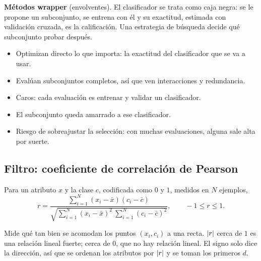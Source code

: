 \documentclass[11pt,letterpaper]{article}
\begin{document}
\textbf{Métodos wrapper} (envolventes). El clasificador se trata como
caja negra: se le propone un subconjunto, se entrena con él y su
exactitud, estimada con validación cruzada, es la calificación. Una
estrategia de búsqueda decide qué subconjunto probar después.

\begin{itemize}[itemsep=0.2em]
    \item[$+$] Optimizan directo lo que importa: la exactitud del
          clasificador que se va a usar.
    \item[$+$] Evalúan subconjuntos completos, así que ven
          interacciones y redundancia.
    \item[$-$] Caros: cada evaluación es entrenar y validar un
          clasificador.
    \item[$-$] El subconjunto queda amarrado a ese clasificador.
    \item[$-$] Riesgo de sobreajustar la selección: con muchas
          evaluaciones, alguna sale alta por suerte.
\end{itemize}


\subsection*{Filtro: coeficiente de correlación de Pearson}

\begin{definicion}
    Para un atributo $x$ y la clase $c$, codificada como $0$ y $1$,
    medidos en $N$ ejemplos,
    \[
        r = \frac{\sum_{i=1}^{N} (x_i - \bar{x})(c_i - \bar{c})}
                 {\sqrt{\sum_{i=1}^{N} (x_i - \bar{x})^2
                        \ \sum_{i=1}^{N} (c_i - \bar{c})^2}} ,
        \qquad -1 \le r \le 1 .
    \]
\end{definicion}

Mide qué tan bien se acomodan los puntos $(x_i, c_i)$ a una recta.
$\left\lvert r \right\rvert$ cerca de $1$ es una relación lineal fuerte; cerca de $0$, que
no hay relación lineal. El signo solo dice la dirección, así que se
ordenan los atributos por $\left\lvert r \right\rvert$ y se toman los primeros $d$.
\end{document}
